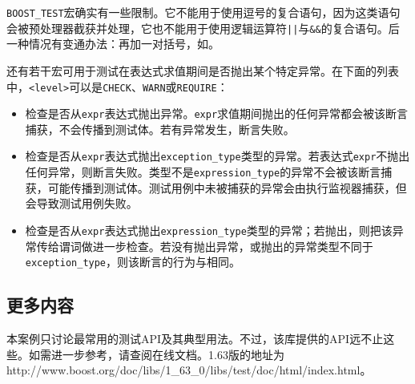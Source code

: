 
\texttt{BOOST\_\allowbreak{}TEST}宏确实有一些限制。它不能用于使用逗号的复合语句，因为这类语句会被预处理器截获并处理，它也不能用于使用逻辑运算符\texttt{||}与\texttt{\&\&}的复合语句。后一种情况有变通办法：再加一对括号，如。



还有若干宏可用于测试在表达式求值期间是否抛出某个特定异常。在下面的列表中，\texttt{<\allowbreak{}level>}可以是\texttt{CHECK}、\texttt{WARN}或\texttt{REQUIRE}：



\begin{itemize}
\item {}检查是否从\texttt{expr}表达式抛出异常。\texttt{expr}求值期间抛出的任何异常都会被该断言捕获，不会传播到测试体。若有异常发生，断言失败。



\item {}检查是否从\texttt{expr}表达式抛出\texttt{exception\_\allowbreak{}type}类型的异常。若表达式\texttt{expr}不抛出任何异常，则断言失败。类型不是\texttt{expression\_\allowbreak{}type}的异常不会被该断言捕获，可能传播到测试体。测试用例中未被捕获的异常会由执行监视器捕获，但会导致测试用例失败。



\item {}检查是否从\texttt{expr}表达式抛出\texttt{expression\_\allowbreak{}type}类型的异常；若抛出，则把该异常传给谓词做进一步检查。若没有抛出异常，或抛出的异常类型不同于\texttt{exception\_\allowbreak{}type}，则该断言的行为与相同。

\end{itemize}



\subsection{更多内容}



本案例只讨论最常用的测试API及其典型用法。不过，该库提供的API远不止这些。如需进一步参考，请查阅在线文档。1.63版的地址为http://\allowbreak{}www.\allowbreak{}boost.\allowbreak{}org/\allowbreak{}doc/\allowbreak{}libs/\allowbreak{}1\_\allowbreak{}63\_\allowbreak{}0/\allowbreak{}libs/\allowbreak{}test/\allowbreak{}doc/\allowbreak{}html/\allowbreak{}index.\allowbreak{}html。


